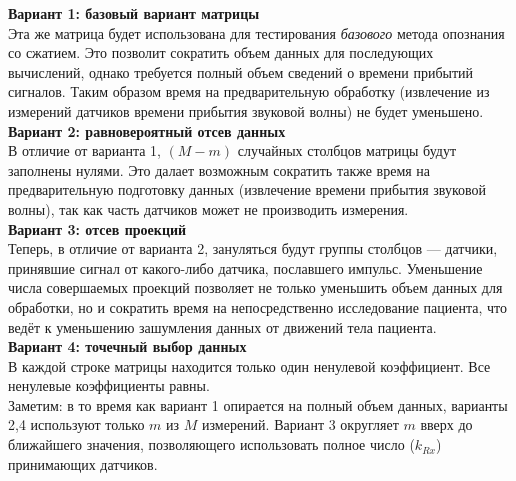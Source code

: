 \documentclass[14pt]{matmex-diploma-custom}
\begin{document}
\textbf{Вариант 1: базовый вариант матрицы}\\

Эта же матрица будет использована для тестирования \textit{базового} метода опознания со сжатием. Это позволит сократить объем данных для последующих вычислений, однако требуется полный объем сведений о времени прибытий сигналов. Таким образом время на предварительную обработку (извлечение из измерений датчиков времени прибытия звуковой волны) не будет уменьшено.\\

\textbf{Вариант 2: равновероятный отсев данных}\\

В отличие от варианта 1, $(M-m)$ случайных столбцов матрицы будут заполнены нулями. Это далает возможным сократить также время на предварительную подготовку данных (извлечение времени прибытия звуковой волны), так как часть датчиков может не производить измерения.\\

\textbf{Вариант 3: отсев проекций}\\

Теперь, в отличие от варианта 2, зануляться будут группы столбцов --- датчики, принявшие сигнал от какого-либо датчика, пославшего импульс. Уменьшение числа совершаемых проекций позволяет не только уменьшить объем данных для обработки, но и сократить время на непосредственно исследование пациента, что ведёт к уменьшению зашумления данных от движений тела пациента. \\

\textbf{Вариант 4: точечный выбор данных}\\

В каждой строке матрицы находится только один ненулевой коэффициент. Все ненулевые коэффициенты равны. \\

Заметим: в то время как вариант 1 опирается на полный объем данных, варианты 2,4 используют только $m \text{ из } M$ измерений. Вариант 3 округляет $m$ вверх до ближайшего значения, позволяющего использовать полное число ($k_{Rx}$) принимающих датчиков.
\end{document}
